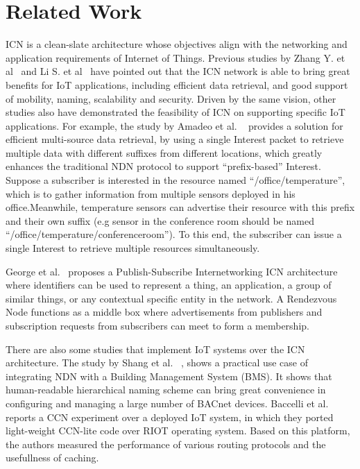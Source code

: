 \section{Related Work}
\label{sec:related}

ICN is a clean-slate architecture whose objectives align with the networking and application requirements of Internet of Things. Previous studies by Zhang Y. et al~\cite{zhang2013icn} and Li S. et al~\cite{li2014comparative} have pointed out that the ICN network is able to bring great benefits for IoT applications, 
including efficient data retrieval,  and good support of mobility, naming, scalability and security. Driven by the same vision, other studies also have demonstrated the feasibility of ICN on supporting specific IoT applications. For example, the study by Amadeo et al. ~\cite{amadeo2014multi} provides a solution for efficient multi-source data retrieval, by 
using a single Interest packet to retrieve multiple data with different suffixes from different locations, which greatly enhances 
the traditional NDN protocol to support  ``prefix-based''  Interest. 
Suppose a subscriber is interested in the resource named ``/office/temperature'', which is  to gather  information from multiple sensors deployed in his office.Meanwhile, temperature sensors can advertise their resource with this prefix and their own suffix (e.g sensor in the conference room should be named ``/office/temperature/conferenceroom''). To this end, the subscriber can issue a single Interest to retrieve multiple resources simultaneously.


George et al.~\cite{polyzos2015building} proposes a Publish-Subscribe Internetworking ICN architecture
where identifiers can be used to represent a thing, an application, a group of similar things, or any contextual specific entity in the network. A Rendezvous Node functions as a middle box where advertisements from publishers and subscription requests from subscribers can meet to form a membership.


There are also some studies that implement IoT systems over the ICN architecture. The study by Shang et al. ~\cite{shang2014securing}, shows a practical use case of  integrating NDN with a Building Management System (BMS). It shows that human-readable hierarchical naming scheme can bring great convenience in configuring and managing a large number of BACnet devices. Baccelli et al.~\cite{baccelli2014information} reports a CCN experiment  over a deployed IoT system, in which they ported light-weight CCN-lite code over RIOT operating system. Based on this platform, the authors measured the performance of various routing protocols and the usefullness of caching.

